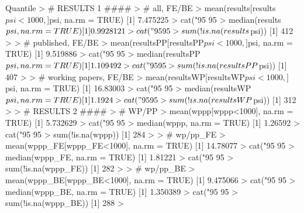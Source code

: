 Quantile
> # RESULTS 1 ####
> # all, FE/BE 
> mean(results[results$psi<1000,]$psi, na.rm = TRUE)
[1] 7.475225
> cat("95%
95%
> median(results$psi, na.rm = TRUE)
[1] 0.9928121
> cat("95%
95%
> sum(!is.na(results$psi))
[1] 412
> 
> # published, FE/BE 
> mean(resultsPP[resultsPP$psi<1000,]$psi, na.rm = TRUE)
[1] 9.519886
> cat("95%
95%
> median(resultsPP$psi, na.rm = TRUE)
[1] 1.109492
> cat("95%
95%
> sum(!is.na(resultsPP$psi))
[1] 407
> 
> # working papers, FE/BE 
> mean(resultsWP[resultsWP$psi<1000,]$psi, na.rm = TRUE)
[1] 16.83003
> cat("95%
95%
> median(resultsWP$psi, na.rm = TRUE)
[1] 1.1924
> cat("95%
95%
> sum(!is.na(resultsWP$psi))
[1] 312
> 
> # RESULTS 2 ####
> # WP/PP
> mean(wppp[wppp<1000], na.rm = TRUE)
[1] 5.732629
> cat("95%
95%
> median(wppp, na.rm = TRUE)
[1] 1.26592
> cat("95%
95%
> sum(!is.na(wppp))
[1] 284
> 
> # wp/pp_FE
> mean(wppp_FE[wppp_FE<1000], na.rm = TRUE)
[1] 14.78077
> cat("95%
95%
> median(wppp_FE, na.rm = TRUE)
[1] 1.81221
> cat("95%
95%
> sum(!is.na(wppp_FE))
[1] 282
> 
> # wp/pp_BE
> mean(wppp_BE[wppp_BE<1000], na.rm = TRUE)
[1] 9.475066
> cat("95%
95%
> median(wppp_BE, na.rm = TRUE)
[1] 1.350389
> cat("95%
95%
> sum(!is.na(wppp_BE))
[1] 288
> 